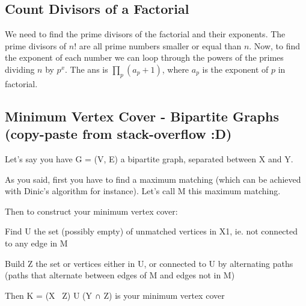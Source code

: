 \documentclass[12pt]{article}%
\begin{document}
\subsection{Count Divisors of a Factorial}

We need to find the prime divisors of the factorial and their exponents. The prime divisors of $n!$ are all prime numbers smaller or equal than $n$. Now, to find the exponent of each number we can loop through the powers of the primes dividing $n$ by $p^x$. The ans is $\prod_{p} (a_p+1)$, where $a_p$ is the exponent of $p$ in factorial.

\subsection{Minimum Vertex Cover - Bipartite Graphs (copy-paste from stack-overflow :D)}

Let's say you have G = (V, E) a bipartite graph, separated between X and Y.

As you said, first you have to find a maximum matching (which can be achieved with Dinic's algorithm for instance). Let's call M this maximum matching.

Then to construct your minimum vertex cover:

Find U the set (possibly empty) of unmatched vertices in X1, ie. not connected to any edge in M

Build Z the set or vertices either in U, or connected to U by alternating paths (paths that alternate between edges of M and edges not in M)

Then K = (X \ Z) U (Y ∩ Z) is your minimum vertex cover
\end{document}

